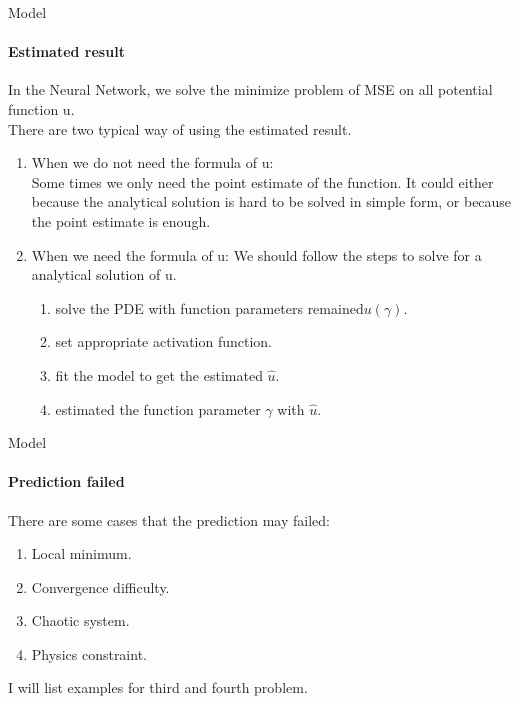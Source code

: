 \begin{frame}{Model}
\framesubtitle{Estimated result}
    In the Neural Network, we solve the minimize problem of MSE on all potential function u.\\
    There are two typical way of using the estimated result.
    \begin{enumerate}
        \item When we do not need the formula of u:\\
        Some times we only need the point estimate of the function. It could either because the analytical solution is hard to be solved in simple form, or because the point estimate is enough.
        
        \item When we need the formula of u:
        We should follow the steps to solve for a analytical solution of u.\\
        \begin{enumerate}
            \item solve the PDE with function parameters remained\(u(\gamma)\).
            \item set appropriate activation function.
            \item fit the model to get the estimated \(\hat{u}\).
            \item estimated the function parameter \(\gamma\) with \(\hat{u}\).
        \end{enumerate}
    \end{enumerate}
\end{frame}

\begin{frame}{Model}
\framesubtitle{Prediction failed}
    There are some cases that the prediction may failed:
    \begin{enumerate}
    \item Local minimum.
    \item Convergence difficulty.
    \item Chaotic system.
    \item Physics constraint.   
    \end{enumerate}
    I will list examples for third and fourth problem.
\end{frame}

